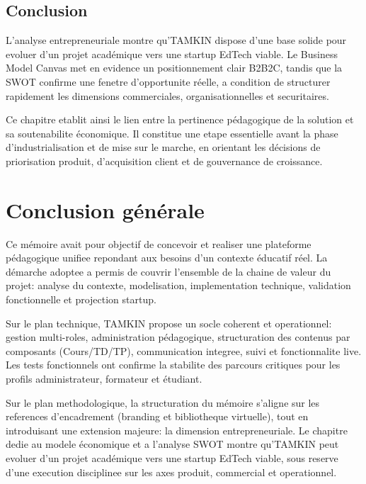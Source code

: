 \documentclass[12pt,a4paper,oneside]{report}
\begin{document}
\section{Conclusion}

L'analyse entrepreneuriale montre qu'TAMKIN dispose d'une base solide pour evoluer d'un projet académique vers une startup EdTech viable. Le Business Model Canvas met en evidence un positionnement clair B2B2C, tandis que la SWOT confirme une fenetre d'opportunite réelle, a condition de structurer rapidement les dimensions commerciales, organisationnelles et securitaires.

Ce chapitre etablit ainsi le lien entre la pertinence pédagogique de la solution et sa soutenabilite économique. Il constitue une etape essentielle avant la phase d'industrialisation et de mise sur le marche, en orientant les décisions de priorisation produit, d'acquisition client et de gouvernance de croissance.


\chapter*{Conclusion générale}

Ce mémoire avait pour objectif de concevoir et realiser une plateforme pédagogique unifiee repondant aux besoins d'un contexte éducatif réel. La démarche adoptee a permis de couvrir l'ensemble de la chaine de valeur du projet: analyse du contexte, modelisation, implementation technique, validation fonctionnelle et projection startup.

Sur le plan technique, TAMKIN propose un socle coherent et operationnel: gestion multi-roles, administration pédagogique, structuration des contenus par composants (Cours/TD/TP), communication integree, suivi et fonctionnalite live. Les tests fonctionnels ont confirme la stabilite des parcours critiques pour les profils administrateur, formateur et étudiant.

Sur le plan methodologique, la structuration du mémoire s'aligne sur les references d'encadrement (branding et bibliotheque virtuelle), tout en introduisant une extension majeure: la dimension entrepreneuriale. Le chapitre dedie au modele économique et a l'analyse SWOT montre qu'TAMKIN peut evoluer d'un projet académique vers une startup EdTech viable, sous reserve d'une execution disciplinee sur les axes produit, commercial et operationnel.
\end{document}
